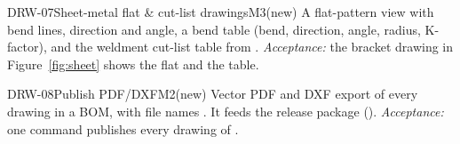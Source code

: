 \begin{epic}{DRW-07}{Sheet-metal flat \& cut-list drawings}{M3}{\stTodo}{(new)}
A flat-pattern view with bend lines, direction and angle, a bend table (bend, direction, angle, radius,
K-factor), and the weldment cut-list table from .
\emph{Acceptance:} the bracket drawing in Figure~\ref{fig:sheet} shows the flat and the table.
\end{epic}

\begin{epic}{DRW-08}{Publish PDF/DXF}{M2}{\stTodo}{(new)}
Vector PDF and DXF export of every drawing in a BOM, with file names . It feeds the
release package ().
\emph{Acceptance:} one command publishes every drawing of .
\end{epic}

